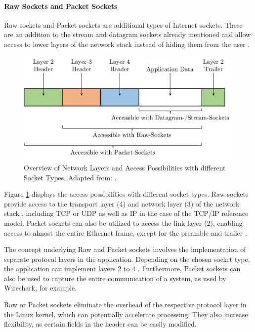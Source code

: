 \paragraph{Raw Sockets and Packet Sockets}

Raw sockets and Packet sockets are additional types of Internet sockets. These are an addition to the stream and datagram sockets already mentioned and allow access to lower layers of the network stack instead of hiding them from the user \cite{sock07}.

\begin{figure}[h]
    \centering
    \includegraphics[width=0.9\linewidth]{figures/linux_nwstack/image02.pdf}
    \caption[Overview of Network Layers and Access Possibilities with different Socket Types]{Overview of Network Layers and Access Possibilities with different Socket Types. Adapted from: \cite{sock07}.}
    \label{fig:SocketAccessPossib}
\end{figure}

Figure \ref{fig:SocketAccessPossib} displays the access possibilities with different socket types. Raw sockets provide access to the transport layer (4) and network layer (3) of the network stack \cite{sock08}, including TCP or UDP as well as IP in the case of the TCP/IP reference model. Packet sockets can also be utilized to access the link layer (2), enabling access to almost the entire Ethernet frame, except for the preamble and trailer \cite{sock09}.

The concept underlying Raw and Packet sockets involves the implementation of separate protocol layers in the application. Depending on the chosen socket type, the application can implement layers 2 to 4 \cite{sock08}. Furthermore, Packet sockets can also be used to capture the entire communication of a system, as used by Wireshark, for example.

Raw or Packet sockets eliminate the overhead of the respective protocol layer in the Linux kernel, which can potentially accelerate processing. They also increase flexibility, as certain fields in the header can be easily modified.

